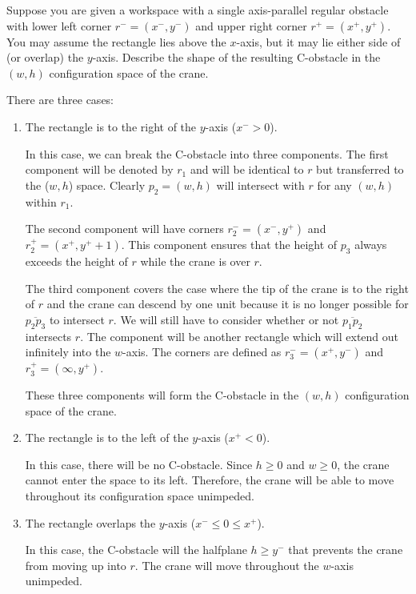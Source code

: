 \documentclass[11pt]{article}
\begin{document}

  Suppose you are given a workspace with a single axis-parallel regular obstacle with
  lower left corner \(r^- = (x^-, y^-)\) and upper right corner \(r^+ = (x^+, y^+)\). You may assume the
  rectangle lies above the \(x\)-axis, but it may lie either side of (or overlap) the \(y\)-axis. Describe
  the shape of the resulting C-obstacle in the \((w, h)\) configuration space of the crane.

\begin{solution}
There are three cases:
\begin{enumerate}[1.]
  \item
    The rectangle is to the right of the \(y\)-axis (\(x^- > 0\)).

    In this case, we can break the C-obstacle into three components. The first component will be denoted by \(r_1\) and will be identical to \(r\) but transferred to the (\(w, h\)) space.
    Clearly \(p_2 = (w,h)\) will intersect with \(r\) for any \((w,h)\) within \(r_1\).
    
    The second component will have corners \(r_2^- = (x^-, y^+)\) and \(r_2^+ = (x^+, y^+ + 1)\). This component ensures that the height of \(p_3\) always exceeds the height of \(r\) while the
    crane is over \(r\).
    
    The third component covers the case where the tip of the crane is to the right of \(r\) and the crane can descend by one unit because it is no longer possible for \(\overline{p_2 p_3}\) to intersect \(r\).
    We will still have to consider whether or not \(\overline{p_1 p_2}\) intersects \(r\).
    The component will be another rectangle which will extend out infinitely into the \(w\)-axis. The corners are defined as \(r_3^- = (x^+, y^-)\) and \(r_3^+ = (\infty, y^+)\).

    These three components will form the C-obstacle in the \((w, h)\) configuration space of the crane.

  \item
    The rectangle is to the left of the \(y\)-axis (\(x^+ < 0\)).

    In this case, there will be no C-obstacle. Since \(h \geq 0\) and \(w \geq 0\), the crane cannot enter the space to its left.
    Therefore, the crane will be able to move throughout its configuration space unimpeded.
  \item
    The rectangle overlaps the \(y\)-axis (\(x^- \leq 0 \leq x^+\)).

    In this case, the C-obstacle will the halfplane \(h \geq y^-\) that prevents the crane from moving up into \(r\). The crane will move throughout the \(w\)-axis unimpeded.
\end{enumerate}
\end{solution}
\end{document}
